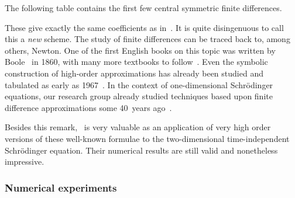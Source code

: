 The following table contains the first few central symmetric finite differences.
\begin{center}
    
\end{center}

These give exactly the same coefficients as in~\cite{wang_new_2009}. It is quite disingenuous to call this a \emph{new} scheme. The study of finite differences can be traced back to, among others, Newton. One of the first English books on this topic was written by Boole~\cite{boole_calculus_1860} in 1860, with many more textbooks to follow~\cite{thomson_calculus_1933,jordan_calculus_1965}. Even the symbolic construction of high-order approximations has already been studied and tabulated as early as 1967~\cite{ballester_construction_1967,keller_symbolic_1978,fornberg_generation_1988}. In the context of one-dimensional Schrödinger equations, our research group already studied techniques based upon finite difference approximations some 40~years ago~\cite{fack_finite_1985,fack_program_1986}.

Besides this remark,~\cite{wang_new_2009} is very valuable as an application of very high order versions of these well-known formulae to the two-dimensional time-independent Schrödinger equation. Their numerical results are still valid and nonetheless impressive.

\subsubsection{Numerical experiments}\label{sec:c4_fd_numerical}

